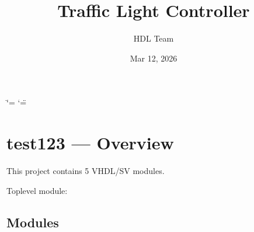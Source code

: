 \documentclass[letterpaper,10pt,english]{sphinxmanual}
\title{Traffic Light Controller}
\date{Mar 12, 2026}
\author{HDL Team}
\begin{document}
\ifdefined\shorthandoff
  \ifnum\catcode`\=\string=\active\shorthandoff{=}\fi
  \ifnum\catcode`\"=\active{}\fi
\fi

\pagestyle{empty}
\sphinxmaketitle
\pagestyle{plain}
\sphinxtableofcontents
\pagestyle{normal}
\label{\detokenize{index::doc}}


\sphinxstepscope


\chapter{test123 — Overview}
\label{\detokenize{overview:test123-overview}}\label{\detokenize{overview::doc}}
\sphinxAtStartPar
This project contains 5 VHDL/SV modules.

\sphinxAtStartPar
Top\sphinxhyphen{}level module: {\hyperref[\detokenize{modules/top/index::doc}]{}}


\section{Modules}
\label{\detokenize{overview:modules}}
\end{document}
